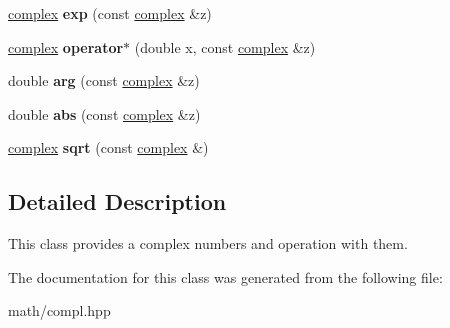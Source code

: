 \begin{DoxyCompactItemize}
\item 
\mbox{\label{classcomplex_a51f6277e09dfe3ef1f168fc188f3e0d4}} 
\mbox{\hyperlink{classcomplex}{complex}} {\bfseries exp} (const \mbox{\hyperlink{classcomplex}{complex}} \&z)
\item 
\mbox{\label{classcomplex_a62b56f87291f00796c75f8c1d0bf184e}} 
\mbox{\hyperlink{classcomplex}{complex}} {\bfseries operator$\ast$} (double x, const \mbox{\hyperlink{classcomplex}{complex}} \&z)
\item 
\mbox{\label{classcomplex_a0ea30f7a0885cad797c703d6cbe0e0e5}} 
double {\bfseries arg} (const \mbox{\hyperlink{classcomplex}{complex}} \&z)
\item 
\mbox{\label{classcomplex_a1e67bbbe3bc1fe0caa07f79e21c8bfe4}} 
double {\bfseries abs} (const \mbox{\hyperlink{classcomplex}{complex}} \&z)
\item 
\mbox{\label{classcomplex_af0192b7748042968290e78b1d03b05ba}} 
\mbox{\hyperlink{classcomplex}{complex}} {\bfseries sqrt} (const \mbox{\hyperlink{classcomplex}{complex}} \&)
\end{DoxyCompactItemize}


\subsection{Detailed Description}
This class provides a complex numbers and operation with them. 

The documentation for this class was generated from the following file\+:\begin{DoxyCompactItemize}
\item 
math/compl.\+hpp\end{DoxyCompactItemize}
